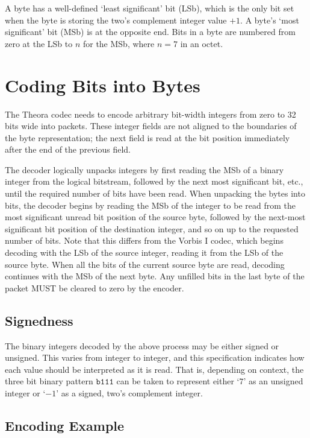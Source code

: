\documentclass[9pt,letterpaper]{book}
\newcommand{\bin}[1]{\ensuremath{\mathtt{b#1}}}
\numberwithin{equation}{chapter}
\numberwithin{figure}{chapter}
\numberwithin{table}{chapter}
\begin{document}
A byte has a well-defined `least significant' bit (LSb), which is the only bit
 set when the byte is storing the two's complement integer value $+1$.
A byte's `most significant' bit (MSb) is at the opposite end.
Bits in a byte are numbered from zero at the LSb to $n$ for the MSb, where
 $n=7$ in an octet.

\section{Coding Bits into Bytes}

The Theora codec needs to encode arbitrary bit-width integers from zero to 32
 bits wide into packets.
These integer fields are not aligned to the boundaries of the byte
 representation; the next field is read at the bit position immediately
 after the end of the previous field.

The decoder logically unpacks integers by first reading the MSb of a binary
 integer from the logical bitstream, followed by the next most significant
 bit, etc., until the required number of bits have been read.
When unpacking the bytes into bits, the decoder begins by reading the MSb of
 the integer to be read from the most significant unread bit position of the
 source byte, followed by the next-most significant bit position of the
 destination integer, and so on up to the requested number of bits.
Note that this differs from the Vorbis I codec, which
 begins decoding with the LSb of the source integer, reading it from the
 LSb of the source byte.
When all the bits of the current source byte are read, decoding continues with
 the MSb of the next byte.
Any unfilled bits in the last byte of the packet MUST be cleared to zero by the
 encoder.

\subsection{Signedness}

The binary integers decoded by the above process may be either signed or
 unsigned.
This varies from integer to integer, and this specification
 indicates how each value should be interpreted as it is read.
That is, depending on context, the three bit binary pattern \bin{111} can be
 taken to represent either `$7$' as an unsigned integer or `$-1$' as a signed,
 two's complement integer.

\subsection{Encoding Example}
\end{document}
